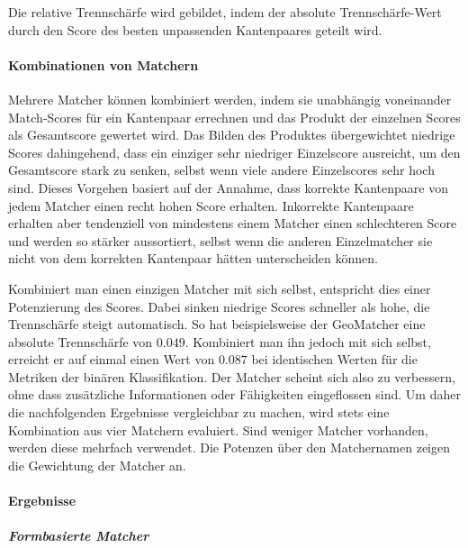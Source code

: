 Die relative Trennschärfe wird gebildet, indem der absolute
Trennschärfe-Wert durch den Score des besten unpassenden Kantenpaares
geteilt wird.

\paragraph{Kombinationen von Matchern}

Mehrere Matcher können kombiniert werden, indem sie unabhängig
voneinander Match-Scores für ein Kantenpaar errechnen und das Produkt
der einzelnen Scores als Gesamtscore gewertet wird. Das Bilden des
Produktes übergewichtet niedrige Scores dahingehend, dass ein einziger
sehr niedriger Einzelscore ausreicht, um den Gesamtscore stark zu
senken, selbst wenn viele andere Einzelscores sehr hoch sind. Dieses
Vorgehen basiert auf der Annahme, dass korrekte Kantenpaare von jedem
Matcher einen recht hohen Score erhalten. Inkorrekte Kantenpaare
erhalten aber tendenziell von mindestens einem Matcher einen
schlechteren Score und werden so stärker aussortiert, selbst wenn die
anderen Einzelmatcher sie nicht von dem korrekten Kantenpaar hätten
unterscheiden können.

Kombiniert man einen einzigen Matcher mit sich selbst, entspricht dies
einer Potenzierung des Scores. Dabei sinken niedrige Scores schneller
als hohe, die Trennschärfe steigt automatisch. So hat beispielsweise der
GeoMatcher eine absolute Trennschärfe von $0.049$. Kombiniert man ihn
jedoch mit sich selbst, erreicht er auf einmal einen Wert von $0.087$ bei
identischen Werten für die Metriken der binären Klassifikation. Der
Matcher scheint sich also zu verbessern, ohne dass zusätzliche
Informationen oder Fähigkeiten eingeflossen sind. Um daher die
nachfolgenden Ergebnisse vergleichbar zu machen, wird stets eine
Kombination aus vier Matchern evaluiert. Sind weniger Matcher vorhanden,
werden diese mehrfach verwendet. Die Potenzen über den Matchernamen
zeigen die Gewichtung der Matcher an.

\paragraph{Ergebnisse}

\subparagraph{Formbasierte Matcher}

